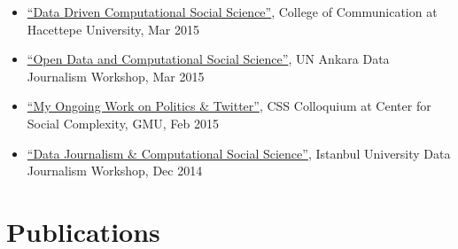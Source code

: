 \documentclass[11pt, letter]{article}
\begin{document}
\begin{raggedright}
\begin{itemize}
\itemsep1pt\parskip0pt
\item
  \href{https://docs.google.com/presentation/d/1yuHfA1NT70XV3GzIa6w_rTN_e8MwqN3yh6PQlqMR_FU}{``Data
  Driven Computational Social Science''}, College of Communication at
  Hacettepe University, Mar 2015
\item
  \href{https://docs.google.com/presentation/d/1GuInZz3N6_9isBn9QYaOMr15VgNiqgpj_Fh7k0iMboE}{``Open
  Data and Computational Social Science''}, UN Ankara Data Journalism
  Workshop, Mar 2015
\item
  \href{http://www.slideshare.net/oztalha/toz-47802496}{``My Ongoing
  Work on Politics \& Twitter''}, CSS Colloquium at Center for Social
  Complexity, GMU, Feb 2015
\item
  \href{https://www.youtube.com/watch?v=ss7GeBDXJRE}{``Data Journalism
  \& Computational Social Science''}, Istanbul University Data
  Journalism Workshop, Dec 2014
\end{itemize}

\section{Publications}\label{publications}


\end{raggedright}
\end{document}
